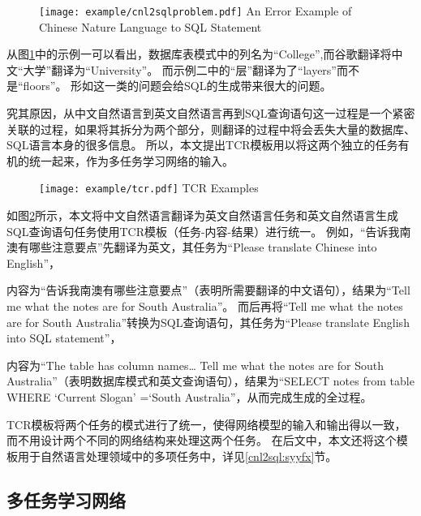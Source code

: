 \begin{figure}[!htp]
    \centering
    \texttt{[image: example/cnl2sqlproblem.pdf]}
      {An Error Example of Chinese Nature Language to SQL Statement}
    \label{fig:cnl2sqlproblem}
  \end{figure}

从图\ref{fig:cnl2sqlproblem}中的示例一可以看出，数据库表模式中的列名为“College”,而谷歌翻译将中文“大学”翻译为“University”。
而示例二中的“层”翻译为了“layers”而不是“floors”。
形如这一类的问题会给SQL的生成带来很大的问题。

究其原因，从中文自然语言到英文自然语言再到SQL查询语句这一过程是一个紧密关联的过程，如果将其拆分为两个部分，则翻译的过程中将会丢失大量的数据库、SQL语言本身的很多信息。
所以，本文提出TCR模板用以将这两个独立的任务有机的统一起来，作为多任务学习网络的输入。

\begin{figure}[!htp]
    \centering
    \texttt{[image: example/tcr.pdf]}
      {TCR Examples}
    \label{fig:cnl2sqltcr}
  \end{figure}

如图\ref{fig:cnl2sqltcr}所示，本文将中文自然语言翻译为英文自然语言任务和英文自然语言生成SQL查询语句任务使用TCR模板（任务-内容-结果）进行统一。
例如，“告诉我南澳有哪些注意要点”先翻译为英文，其任务为“Please translate Chinese into English”，

内容为“告诉我南澳有哪些注意要点”（表明所需要翻译的中文语句），结果为“Tell me what the notes are for South Australia”。
而后再将“Tell me what the notes are for South Australia”转换为SQL查询语句，其任务为“Please translate English into SQL statement”，

内容为“The table has column names… Tell me what the notes are for South Australia”（表明数据库模式和英文查询语句），结果为“SELECT notes from table WHERE ‘Current Slogan’ =‘South Australia”，从而完成生成的全过程。

TCR模板将两个任务的模式进行了统一，使得网络模型的输入和输出得以一致，而不用设计两个不同的网络结构来处理这两个任务。
在后文中，本文还将这个模板用于自然语言处理领域中的多项任务中，详见\ref{cnl2sql:syyfx}节。

\subsection{多任务学习网络}


